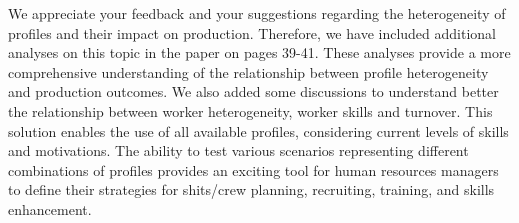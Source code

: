 \documentclass[preprint,11pt,3p]{elsarticle}
\begin{document}
\begin{tcolorbox}[colback=r_color1,colframe=r_color2,title=R15:]
We appreciate your feedback and your suggestions regarding the heterogeneity of profiles and their impact on production. 
Therefore, we have included additional analyses on this topic in the paper on pages 39-41. These analyses provide a more comprehensive understanding of the relationship between profile heterogeneity and production outcomes. We also added some discussions to understand better the relationship between worker heterogeneity, worker skills and turnover.
This solution enables the use of all available profiles, considering current levels of skills and motivations. The ability to test various scenarios representing different combinations of profiles provides an exciting tool for human resources managers to define their strategies for shits/crew planning, recruiting, training, and skills enhancement.
\end{tcolorbox}
\end{document}
